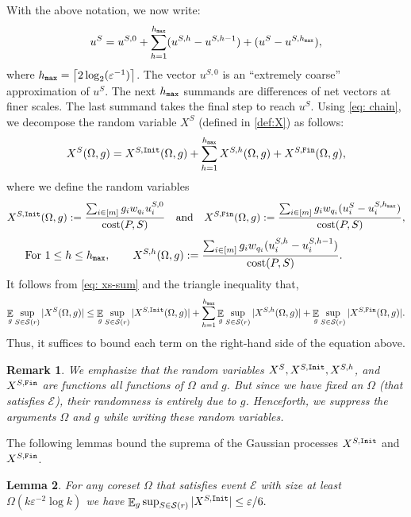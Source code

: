 \documentclass[11pt]{article}
\newtheorem{lemma}{Lemma}[section]
\newtheorem{remark}[lemma]{Remark}
\theoremstyle{restate}
\theoremstyle{definition}
\newcommand{\eps}{\ensuremath{\varepsilon}}
\newcommand{\ceil}[1]{{\left\lceil{#1}\right\rceil}}
\newcommand{\E}{\mathop{\mathbb{E}}}
\newcommand{\cost}{\textnormal{cost}}
\newcommand{\uvec}[1]{u^{#1}} %
\newcommand{\uq}[2]{u^{#1}_{#2}} %
\newcommand{\init}{\ensuremath{\textnormal{\texttt{Init}}}}
\newcommand{\fin}{\ensuremath{\textnormal{\texttt{Fin}}}}
\newcommand{\inSR}{\in \mathcal{S}(r)}
\newcommand{\hmax}{h_\ensuremath{\textnormal{\texttt{max}}}}
\begin{document}
With the above notation, we now write: 
\begin{align} \label{eq: chain}
    \uvec{S} = \uvec{S,0} + \sum_{h = 1}^{\hmax}(\uvec{S,h} - \uvec{S,h-1}) + (\uvec{S} - \uvec{S,\hmax}), 
\end{align} 
where $\hmax =  \ceil{2\log_2(\eps^{-1})}$. The vector $\uvec{S,0}$  is an  ``extremely coarse'' approximation of $\uvec{S}$. The next $\hmax$ summands are differences of net vectors at finer scales. The last summand takes the final step to reach $\uvec{S}$. Using \eqref{eq: chain}, we decompose the random variable $X^S$ (defined in \eqref{def:X}) as follows:  
\begin{align}\label{eq: xs-sum}
    X^S(\Omega,g) = X^{S,\init}(\Omega,g) + \sum_{h = 1}^{\hmax} X^{S,h}(\Omega,g)+X^{S,\fin}(\Omega,g),
\end{align} where we define the random variables
\begin{align}\label{eq: x-init-fin}
    X^{S,\init}(\Omega,g) {}:={} \frac{\sum_{i \in [m]} g_i w_{q_i} \uq{S,0}{i}}{\cost(P,S) } \quad\text{and}\quad  X^{S,\fin}(\Omega,g) := \frac{\sum_{i \in [m]} g_i w_{q_i} (\uq{S}{i} - \uq{S,\hmax}{i})}{\cost(P,S)},
\end{align}
\begin{align}\label{eq: xsh}
   \text{For } 1 \leq h \leq \hmax,  \qquad X^{S,h}(\Omega,g) := \frac{\sum_{i \in [m]}g_i w_{q_i} (\uq{S,h}{i} - \uq{S,h-1}{i})}{\cost(P,S)}.\qquad \qquad
\end{align}
\noindent It follows from \eqref{eq: xs-sum}  and the triangle inequality that,
\[
    \E_{g} \sup_{S \inSR} |X^S(\Omega,g)| \leq \E_{ g} \sup_{S \inSR}|X^{S,\init}(\Omega,g)|+\sum_{h = 1}^ {\hmax} \E_{g} \sup_{S\inSR} |X^{S,h}(\Omega,g)|+\E_{g} \sup_{S\inSR}|X^{S ,\fin}(\Omega,g)|.
\]
Thus, it suffices to bound each term on the right-hand side of the equation above.


\begin{remark}
     We emphasize that the random variables $X^S, X^{S,\init}, X^{S,h}$, and $X^{S,\fin}$ are functions all functions of $\Omega$ and $g$. But since we have fixed an $\Omega$ (that satisfies $\mathcal{E}$), their randomness is entirely due to $g$. Henceforth, we suppress the arguments $\Omega$ and $g$ while writing these random variables.
\end{remark}

The following lemmas bound the suprema of the Gaussian processes $X^{S,\init}$ and $X^{S,\fin}$. 

\begin{lemma}
\label{lem:Xinit}
For any coreset $\Omega$ that satisfies event $\mathcal{E}$ with size at least $\Omega(k \eps^{-2} \log k) $ we have $\E_{g} \sup_{S \inSR} |X^{S,\init}| \leq \eps/6.
$
\end{lemma}
\end{document}
